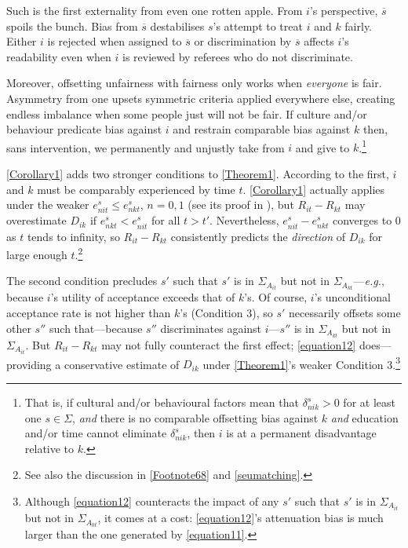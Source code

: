 Such is the first externality from even one rotten apple. From $i$'s perspective, $\overline s$ spoils the bunch. Bias from $\overline s$ destabilises $s$'s attempt to treat $i$ and $k$ fairly. Either $i$ is rejected when assigned to $\overline s$ or discrimination by $\overline s$ affects $i$'s readability even when $i$ is reviewed by referees who do not discriminate.

Moreover, offsetting unfairness with fairness only works when \emph{everyone} is fair. Asymmetry from one upsets symmetric criteria applied everywhere else, creating endless imbalance when some people just will not be fair. If culture and\slash or behaviour predicate bias against $i$ and restrain comparable bias against $k$ then, sans intervention, we permanently and unjustly take from $i$ and give to $k$.\footnote{That is, if cultural and\slash or behavioural factors mean that $\delta_{nik}^s>0$ for at least one $s\in\Sigma$, \emph{and} there is no comparable offsetting bias against $k$ \emph{and} education and\slash or time cannot eliminate $\delta_{nik}^s$, then $i$ is at a permanent disadvantage relative to $k$.}

\autoref{Corollary1} adds two stronger conditions to \autoref{Theorem1}. According to the first, $i$ and $k$ must be comparably experienced by time $t$. \autoref{Corollary1} actually applies under the weaker $e_{nit}^s\le e_{nkt}^s$, $n=0,1$ (see its proof in ), but $R_{it}-R_{kt}$ may overestimate $D_{ik}$ if $e_{nkt}^s<e_{nit}^s$ for all $t>t'$. Nevertheless, $e_{nit}^s-e_{nkt}^s$ converges to 0 as $t$ tends to infinity, so $R_{it}-R_{kt}$ consistently predicts the \emph{direction} of $D_{ik}$ for large enough $t$.\footnote{See also the discussion in \autoref{Footnote68} and \autoref{seumatching}.}

The second condition precludes $s'$ such that $s'$ is in $\Sigma_{A_{it}}$ but not in $\Sigma_{A_{kt}}$---\emph{e.g.}, because $i$'s utility of acceptance exceeds that of $k$'s. Of course, $i$'s unconditional acceptance rate is not higher than $k$'s (Condition 3), so $s'$ necessarily offsets some other $s''$ such that---because $s''$ discriminates against $i$---$s''$ is in $\Sigma_{A_{kt}}$ but not in $\Sigma_{A_{it}}$. But $R_{it}-R_{kt}$ may not fully counteract the first effect; \autoref{equation12} does---providing a conservative estimate of $D_{ik}$ under \autoref{Theorem1}'s weaker Condition 3.\footnote{Although \autoref{equation12} counteracts the impact of any $s'$ such that $s'$ is in $\Sigma_{A_{it}}$ but not in $\Sigma_{A_{kt}}$, it comes at a cost: \autoref{equation12}'s attenuation bias is much larger than the one generated by \autoref{equation11}.}

